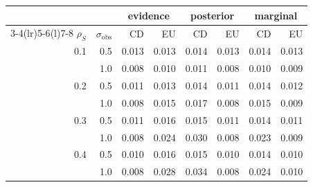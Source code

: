 \footnotesize
\begin{tabular}{rrrrrrrr}
\toprule
& & \multicolumn{2}{c}{evidence} & \multicolumn{2}{c}{posterior} & \multicolumn{2}{c}{marginal} \\ \cmidrule(lr){3-4}\cmidrule(lr){5-6}\cmidrule(l){7-8}
$\rho_S$ & $\sigma_{\mathrm{obs}}$ & CD & EU & CD & EU & CD & EU \\
\midrule
0.1 & 0.5 & 0.013 & 0.013 & 0.014 & 0.013 & 0.014 & 0.013 \\
 & 1.0 & 0.008 & 0.010 & 0.011 & 0.008 & 0.010 & 0.009 \\
0.2 & 0.5 & 0.011 & 0.013 & 0.014 & 0.011 & 0.014 & 0.012 \\
 & 1.0 & 0.008 & 0.015 & 0.017 & 0.008 & 0.015 & 0.009 \\
0.3 & 0.5 & 0.011 & 0.016 & 0.015 & 0.011 & 0.014 & 0.011 \\
 & 1.0 & 0.008 & 0.024 & 0.030 & 0.008 & 0.023 & 0.009 \\
0.4 & 0.5 & 0.010 & 0.016 & 0.015 & 0.010 & 0.014 & 0.010 \\
 & 1.0 & 0.008 & 0.028 & 0.034 & 0.008 & 0.024 & 0.010 \\
\bottomrule
\end{tabular}
